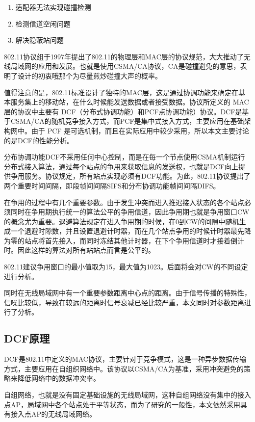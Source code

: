 \documentclass{article}
\begin{document}
\begin{enumerate}
	
	\item {适配器无法实现碰撞检测}
	\item {检测信道空闲问题}
	\item {解决隐蔽站问题}
	
\end{enumerate}

802.11协议组于1997年提出了802.11的物理层和MAC层的协议规范，大大推动了无线局域网的应用和发展。也就是使用CSMA/CA协议，CA是碰撞避免的意思，表明了设计的初衷哦那个为尽量煎炒碰撞大声的概率。

值得注意的是，802.11标准设计了独特的MAC层，这是通过协调功能来确定在基本服务集上的移动站，在什么时候能发送数据或者接受数据。协议所定义的 MAC 层的协议中主要有 DCF（分布式协调功能）和PCF点协调功能）协议。DCF是基于CSMA/CA的随机竞争接入方式，而PCF是集中式接入方式，主要应用在基础架构网中。由于 PCF 是可选机制，而且在实际应用中较少采用，所以本文主要讨论的是DCF的性能分析。

分布协调功能DCF不采用任何中心控制，而是在每一个节点使用CSMA机制运行分布式接入算法，通过每个站点的争用来获取信息的发送权，也就是DCF向上提供争用服务。协议规定，所有站点实现必须有DCF功能。为此，802.11协议提出了两个重要时间间隔，即段帧间间隔SIFS和分布协调功能帧间间隔DIFS。

在争用的过程中有几个重要参数。由于发生冲突而进入推迟接入状态的各个站点必须同时在争用期执行统一的算法公平的争用信道，因此争用期也就是争用窗口CW的概念尤为重要。退避算法规定在进入争用期的时候，在0到CW的间隙中随机生成一个退避时隙数，并且设置退避计时器，而在几个站点争用的时候计时器最先降为零的站点将首先接入，而同时冻结其他计时器，在下个争用信道时才接着倒计时。因此这样的算法对所有站站点而言是公平的。

802.11建议争用窗口的最小值取为15，最大值为1023。后面将会对CW的不同设定进行分析。

同时在无线局域网中有一个重要参数距离中心点的距离。由于信号传播的特殊性，信噪比较低，导致在较远的距离时信号衰减已经比较严重，本文同时对参数距离进行了分析。

\subsection{DCF原理}
DCF是802.11中定义的MAC协议，主要针对于竞争模式，这是一种异步数据传输方式，主要应用在自组织网络中。该协议以CSMA/CA为基准，采用冲突避免的策略来降低网络中的数据冲突率。

自组网络，也就是没有固定基础设施的无线局域网，这种自组网络没有集中的接入点AP，局域网中各个站点处于平等状态，而为了研究的一般性，本文依然采用具有接入点AP的无线局域网络。
\end{document}
